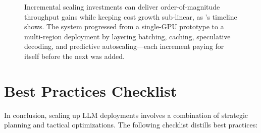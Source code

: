 \begin{figure}[t]
\begin{llmfigbox}
\end{llmfigbox}
\caption{Incremental scaling investments can deliver order-of-magnitude throughput gains while keeping cost growth sub-linear, as \ishtar{}'s timeline shows. The system progressed from a single-GPU prototype to a multi-region deployment by layering batching, caching, speculative decoding, and predictive autoscaling---each increment paying for itself before the next was added.}
\label{fig:ch06_ishtar_timeline}
\end{figure}

\section{Best Practices Checklist}
\label{sec:scaling-best-practices}
In conclusion, scaling up LLM deployments involves a combination of strategic planning and tactical optimizations. The following checklist distills best practices:

